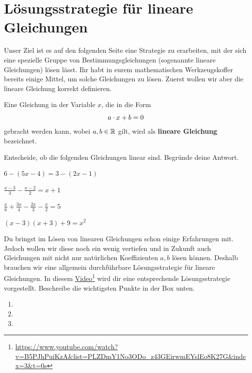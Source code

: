 \documentclass[11pt,oneside]{article}
\begin{document}
\section{Lösungsstrategie für lineare Gleichungen}
	Unser Ziel ist es auf den folgenden Seite eine Strategie zu erarbeiten, mit der sich eine spezielle Gruppe von Bestimmungsgleichungen (sogenannte lineare Gleichungen) lösen lässt. Ihr habt in eurem mathematischen Werkzeugskoffer bereits einige Mittel, um solche Gleichungen zu lösen. Zuerst wollen wir aber die lineare Gleichung korrekt definieren.
	\begin{definition}
		Eine Gleichung in der Variable $x$, die in die Form \[a\cdot x+b=0\] gebracht werden kann, wobei $a, b\in\mathbb{R}$ gilt, wird als \textbf{lineare Gleichung} bezeichnet.
	\end{definition}
	\begin{aufgabe}
		Entscheide, ob die folgenden Gleichungen linear sind. Begründe deine Antwort.
		\begin{enumcols}[2]
			\item $6-(5x-4)=3-(2x-1)$
			\item $\frac{x-3}{3}-\frac{x-2}{2}=x+1$
			\item $\frac{x}{6}+\frac{3x}{4}-\frac{2x}{3}-\frac{x}{2}=5$
			\item $(x-3)(x+3)+9=x^2$
		\end{enumcols}
	\end{aufgabe}
	Du bringst im Lösen von linearen Gleichungen schon einige Erfahrungen mit. Jedoch wollen wir diese noch ein wenig vertiefen und in Zukunft auch Gleichungen mit nicht nur natürlichen Koeffizienten $a,b$ lösen können. Deshalb brauchen wir eine allgemein durchführbare Lösungsstrategie für lineare Gleichungen. In diesem \href{https://www.youtube.com/watch?v=B5PJhPuiKzA&list=PLZDmY1No3ODo_z43GEirwmEYslEo8K27G&index=3&t=0s}{Video}\footnote{\url{https://www.youtube.com/watch?v=B5PJhPuiKzA&list=PLZDmY1No3ODo_z43GEirwmEYslEo8K27G&index=3&t=0s}} wird dir eine entsprechende Lösungsstrategie vorgestellt. Beschreibe die wichtigsten Punkte in der Box unten.
	\begin{algo}[Lösungsstrategie]
		\begin{enumerate}
			\item {}
			\item {}
			\item {}
		\end{enumerate}
	\end{algo}
\end{document}
